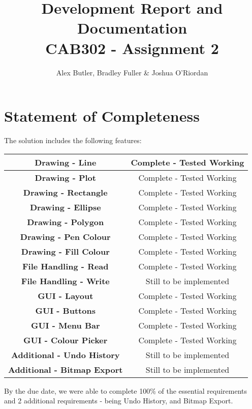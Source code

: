 \documentclass[12pt]{article} %
\begin{document}

\title{Development Report and Documentation
		 \\ \large CAB302 - Assignment 2}

\author {Alex Butler,  Bradley Fuller \& Joshua O'Riordan}
\maketitle

\newpage

\tableofcontents

\newpage

\section{Statement of Completeness}

The solution includes the following features: 
\begin{center}
	\begin{tabular}{|c|c|}
		\hline  \textbf{Drawing - Line} & Complete - Tested Working \\
		\hline  \textbf{Drawing - Plot} & Complete - Tested Working \\
		\hline  \textbf{Drawing - Rectangle} & Complete - Tested Working \\
		\hline  \textbf{Drawing - Ellipse} & Complete - Tested Working \\
		\hline  \textbf{Drawing - Polygon} & Complete - Tested Working \\
		\hline  \textbf{Drawing - Pen Colour} & Complete - Tested Working \\
		\hline  \textbf{Drawing - Fill Colour} & Complete - Tested Working \\
		\hline  \textbf{File Handling - Read} & Complete - Tested Working \\
		\hline  \textbf{File Handling - Write} & Still to be implemented \\
		\hline  \textbf{GUI - Layout} & Complete - Tested Working \\
		\hline  \textbf{GUI - Buttons} & Complete - Tested Working \\
		\hline  \textbf{GUI - Menu Bar} & Complete - Tested Working \\
		\hline  \textbf{GUI - Colour Picker} & Complete - Tested Working \\
		\hline  \textbf{Additional - Undo History} & Still to be implemented \\
		\hline  \textbf{Additional - Bitmap Export} & Still to be implemented \\
		\hline
	\end{tabular}
\end{center}
By the due date, we were able to complete 100\% of the essential requirements and 2 additional requirements - being Undo History, and Bitmap Export. 
\end{document}
